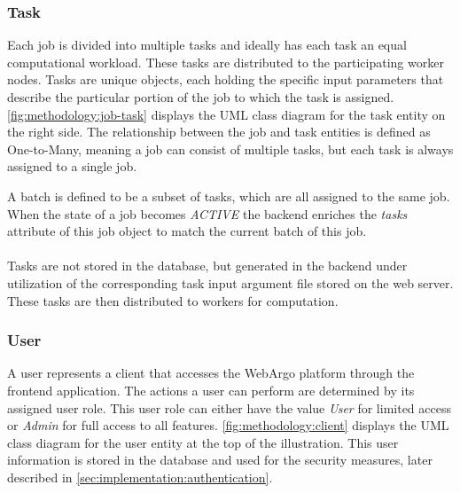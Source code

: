 \subsubsection{Task}
Each job is divided into multiple tasks and ideally has each task an equal computational workload. These tasks are distributed to the participating worker nodes. Tasks are unique objects, each holding the specific input parameters that describe the particular portion of the job to which the task is assigned. \autoref{fig:methodology:job-task} displays the \ac{UML} class diagram for the task entity on the right side. The relationship between the job and task entities is defined as One-to-Many, meaning a job can consist of multiple tasks, but each task is always assigned to a single job.

A batch is defined to be a subset of tasks, which are all assigned to the same job. When the state of a job becomes \emph{ACTIVE} the backend enriches the \emph{tasks} attribute of this job object to match the current batch of this job.
\\~\\
Tasks are not stored in the database, but generated in the backend under utilization of the corresponding task input argument file stored on the web server. These tasks are then distributed to workers for computation.

\subsubsection{User}
A user represents a client that accesses the WebArgo platform through the frontend application. The actions a user can perform are determined by its assigned user role. This user role can either have the value \emph{User} for limited access or \emph{Admin} for full access to all features. \autoref{fig:methodology:client} displays the \ac{UML} class diagram for the user entity at the top of the illustration. This user information is stored in the database and used for the security measures, later described in \autoref{sec:implementation:authentication}. 

